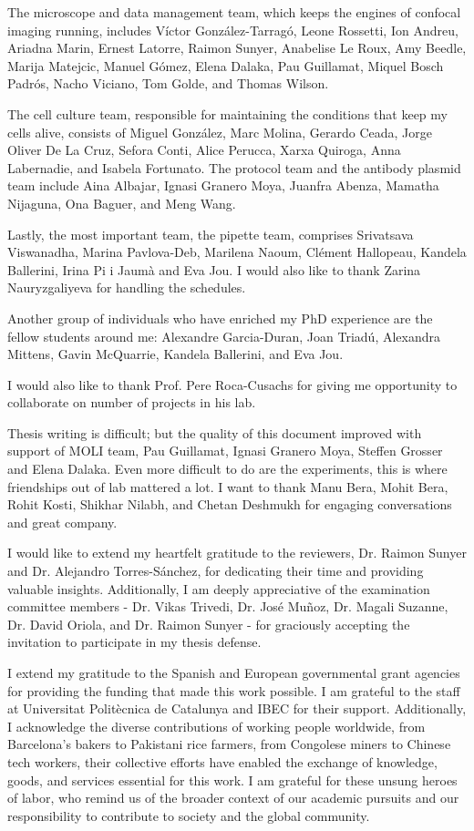 \begin{Acknowledgements}
	The microscope and data management team, which keeps the engines of confocal imaging running, includes Víctor González-Tarragó, Leone Rossetti, Ion Andreu, Ariadna Marin, Ernest Latorre, Raimon Sunyer, Anabelise Le Roux, Amy Beedle, Marija Matejcic, Manuel Gómez, Elena Dalaka, Pau Guillamat, Miquel Bosch Padrós, Nacho Viciano, Tom Golde, and Thomas Wilson.
	
	The cell culture team, responsible for maintaining the conditions that keep my cells alive, consists of Miguel González, Marc Molina, Gerardo Ceada, Jorge Oliver De La Cruz, Sefora Conti, Alice Perucca, Xarxa Quiroga, Anna Labernadie, and Isabela Fortunato. The protocol team and the antibody plasmid team include Aina Albajar, Ignasi Granero Moya, Juanfra Abenza, Mamatha Nijaguna, Ona Baguer, and Meng Wang.
	
	Lastly, the most important team, the pipette team, comprises Srivatsava Viswanadha, Marina Pavlova-Deb, Marilena Naoum, Clément Hallopeau, Kandela Ballerini, Irina Pi i Jaumà and Eva Jou. I would also like to thank Zarina Nauryzgaliyeva for handling the schedules.
	
	Another group of individuals who have enriched my PhD experience are the fellow students around me: Alexandre Garcia-Duran, Joan Triadú, Alexandra Mittens, Gavin McQuarrie, Kandela Ballerini, and Eva Jou.
	
	I would also like to thank Prof. Pere Roca-Cusachs for giving me opportunity to collaborate on number of projects in his lab.
	
	Thesis writing is difficult; but the quality of this document improved with support of MOLI team, Pau Guillamat, Ignasi Granero Moya, Steffen Grosser and Elena Dalaka. Even more difficult to do are the experiments, this is where friendships out of lab mattered a lot. I want to thank Manu Bera, Mohit Bera, Rohit Kosti, Shikhar Nilabh, and Chetan Deshmukh for engaging conversations and great company.
	
	I would like to extend my heartfelt gratitude to the reviewers, Dr. Raimon Sunyer and Dr. Alejandro Torres-Sánchez, for dedicating their time and providing valuable insights. Additionally, I am deeply appreciative of the examination committee members - Dr. Vikas Trivedi, Dr. José Muñoz, Dr. Magali Suzanne, Dr. David Oriola, and Dr. Raimon Sunyer - for graciously accepting the invitation to participate in my thesis defense.
	
	I extend my gratitude to the Spanish and European governmental grant agencies for providing the funding that made this work possible. I am grateful to the staff at Universitat Politècnica de Catalunya and IBEC for their support. Additionally, I acknowledge the diverse contributions of working people worldwide, from Barcelona's bakers to Pakistani rice farmers, from  Congolese miners to Chinese tech workers, their collective efforts have enabled the exchange of knowledge, goods, and services essential for this work. I am grateful for these unsung heroes of labor, who remind us of the broader context of our academic pursuits and our responsibility to contribute to society and the global community.
	

\end{Acknowledgements}
